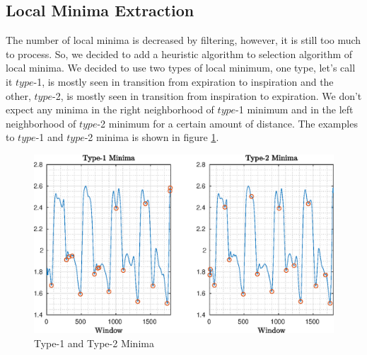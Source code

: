 \subsection{Local Minima Extraction}
The number of local minima is decreased by filtering, however, it is still too much to process. So, we decided to add a heuristic algorithm to selection algorithm of local minima. We decided to use two types of local minimum, one type, let's call it $type$-1, is mostly seen in transition from expiration to inspiration and the other, $type$-2, is mostly seen in transition from inspiration to expiration. We don't expect any minima in the right neighborhood of $type$-1 minimum and in the left neighborhood of $type$-2 minimum for a certain amount of distance. 
The examples to $type$-1 and $type$-2 minima is shown in figure \ref{fig:minima}.
\begin{figure}
	\begin{center}
		\includegraphics[width=\textwidth]{figures/minima.eps}
		\caption{Type-1 and Type-2 Minima}
		\label{fig:minima}
	\end{center}
\end{figure}
